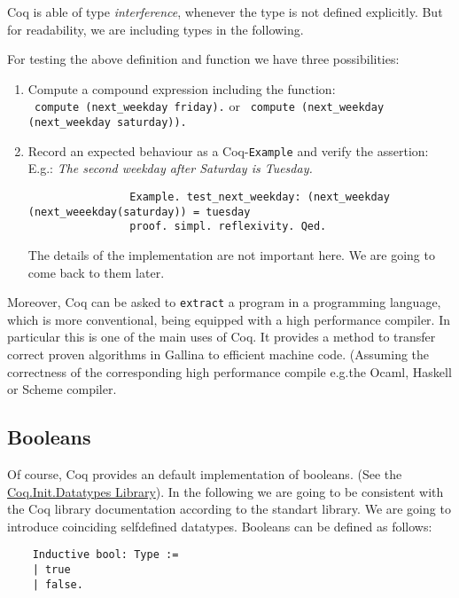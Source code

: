   Coq is able of type {\itshape interference}, whenever the type is not defined explicitly.
  But for readability, we are including types in the following.
   
  For testing the above definition and function we have three possibilities:   
   \begin{enumerate}
   \item Compute a compound expression including the function:\\
 		 \lstinline! compute (next_weekday friday).! or 
   		 \lstinline! compute (next_weekday (next_weekday saturday)).!
   \item Record an expected behaviour as a Coq-\lstinline!Example! and verify the assertion: 
         E.g.: {\itshape The second weekday after Saturday is Tuesday.}  
   
		   \begin{lstlisting}
		   		Example. test_next_weekday: (next_weekday (next_weeekday(saturday)) = tuesday 
		   		proof. simpl. reflexivity. Qed.
		   \end{lstlisting}
   			The details of the implementation are not important here. We are going to come back to them later.
   \end{enumerate}   

    Moreover, Coq can be asked to \lstinline!extract! a program in a programming language, which is more conventional, being equipped with a high performance compiler.
    In particular this is one of the main uses of Coq. 
    It provides a method to transfer correct proven algorithms in Gallina to efficient machine code.
    (Assuming the correctness of the corresponding high performance compile e.g.the Ocaml, Haskell or Scheme compiler. 


\subsection{Booleans}

    Of course, Coq provides an default implementation of booleans. (See the \href{https://www.cs.princeton.edu/courses/archive/fall07/cos595/stdlib/html/Coq.Init.Datatypes.html}{Coq.Init.Datatypes Library}). %
    In the following we are going to be consistent with the Coq library documentation according to the standart library. We are going to introduce coinciding selfdefined datatypes.
    Booleans can be defined as follows:
    
    \label{Def:booleans}
    \begin{lstlisting}    
    Inductive bool: Type :=
    | true
    | false.
    \end{lstlisting}
    

